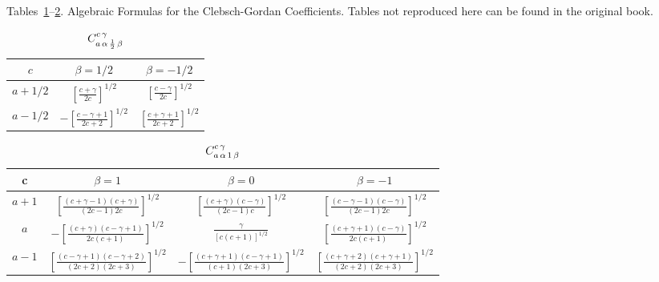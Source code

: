 Tables~\ref{chap8:tab:1}--\ref{chap8:tab:2}. Algebraic Formulas for the Clebsch-Gordan Coefficients.
Tables not reproduced here can be found in the original book.
\begin{table}[tbh!]
\begin{center}
\caption{$C_{a\,\alpha\,\frac{1}{2}\,\beta}^{c\,\gamma}$}
\label{chap8:tab:1}
\begin{tabular}{c|c|c}
\hline
$c$ & $\beta=1 / 2$ & $\beta=-1 / 2$ \\
\hline
$a+1 / 2$ & $\left[\frac{c+\gamma}{2 c}\right]^{1 / 2}$ & $\left[\frac{c-\gamma}{2 c}\right]^{1 / 2}$ \\
$a-1 / 2$ & $-\left[\frac{c-\gamma+1}{2 c+2}\right]^{1 / 2}$ & $\left[\frac{c+\gamma+1}{2 c+2}\right]^{1 / 2}$ \\
\end{tabular}
\end{center}
\end{table}

\begin{table}[tbh!]
\begin{center}
\caption{$C_{a\,\alpha\,1\,\beta}^{c\,\gamma}$}
\label{chap8:tab:2}
\begin{tabular}{c|c|c|c}
\hline
c & $\beta=1$ & $\beta=0$ & $\beta=-1$ \\
\hline
$a+1$ & $\left[\frac{(c+\gamma-1)(c+\gamma)}{(2 c-1) 2 c}\right]^{1 / 2}$ & 
\(\left[\frac{(c+\gamma)(c-\gamma)}{(2 c-1) c}\right]^{1 / 2}\)& 
\(\left[\frac{(c-\gamma-1)(c-\gamma)}{(2 c-1) 2c}\right]^{1 / 2}\)
\\
$a$ & \(-\left[\frac{(c+\gamma)(c-\gamma+1)}{2 c(c+1)}\right]^{1 / 2 }\) &\(\frac{\gamma}{[c(c+1)]^{1 / 2}}\)&
$\left[\frac{(c+\gamma+1)(c-\gamma)}{2 c(c+1)}\right]^{1 / 2}$\\
$a-1$ & \(  \left[\frac{(c-\gamma+1)(c-\gamma+2)}{(2 c+2)(2 c+3)}\right]^{1 / 2} \) 
 & \(-\left[\frac{(c+\gamma+1)(c-\gamma+1)}{( c+1)(2 c+3)}\right]^{1 / 2} \)
 & \( \left[\frac{(c+\gamma+2)(c+\gamma+1)}{(2 c+2)(2 c+3)}\right]^{1 / 2} \) 
\end{tabular}
\end{center}
\end{table}

